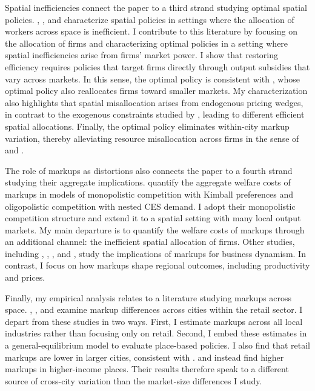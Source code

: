 Spatial inefficiencies connect the paper to a third strand studying optimal spatial policies. \textcite{Fajgelbaum&Gaubert20,Fajgelbaum&Gaubert25}, \textcite{RossiHansbergSarte&Schwartzman26}, and \textcite{DonaldFukui&Miyauchi23} characterize spatial policies in settings where the allocation of workers across space is inefficient. I contribute to this literature by focusing on the allocation of firms and characterizing optimal policies in a setting where spatial inefficiencies arise from firms’ market power. I show that restoring efficiency requires policies that target firms directly through output subsidies that vary across markets. In this sense, the optimal policy is consistent with \textcite{Bilal23}, whose optimal policy also reallocates firms toward smaller markets. My characterization also highlights that spatial misallocation arises from endogenous pricing wedges, in contrast to the exogenous constraints studied by \textcite{Hsieh&Moretti19}, leading to different efficient spatial allocations. Finally, the optimal policy eliminates within-city markup variation, thereby alleviating resource misallocation across firms in the sense of \textcite{Restuccia&Rogerson08} and \textcite{Hsieh&Klenow09}.

The role of markups as distortions also connects the paper to a fourth strand studying their aggregate implications. \textcite{EdmondMidrigan&Xu23} quantify the aggregate welfare costs of markups in models of monopolistic competition with Kimball preferences and oligopolistic competition with nested CES demand. I adopt their monopolistic competition structure and extend it to a spatial setting with many local output markets. My main departure is to quantify the welfare costs of markups through an additional channel: the inefficient spatial allocation of firms. Other studies, including \textcite{Peters20}, \textcite{DeLoeckerEeckhout&Mongey22}, \textcite{Aghionetal23}, and \textcite{Akcigit&Ates23}, study the implications of markups for business dynamism. In contrast, I focus on how markups shape regional outcomes, including productivity and prices.

Finally, my empirical analysis relates to a literature studying markups across space. \textcite{Hottman21}, \textcite{AndersonRebelo&Wong23}, and \textcite{sangani2022markups} examine markup differences across cities within the retail sector. I depart from these studies in two ways. First, I estimate markups across all local industries rather than focusing only on retail. Second, I embed these estimates in a general-equilibrium model to evaluate place-based policies. I also find that retail markups are lower in larger cities, consistent with \textcite{Hottman21}. \textcite{AndersonRebelo&Wong23} and \textcite{sangani2022markups} instead find higher markups in higher-income places. Their results therefore speak to a different source of cross-city variation than the market-size differences I study.

